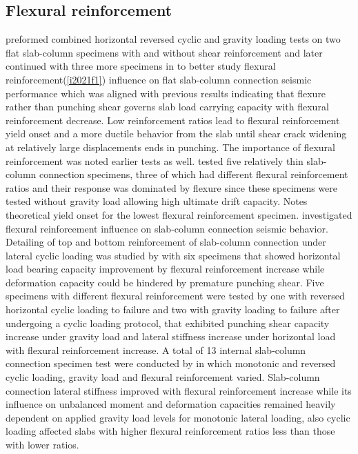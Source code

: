 \subsection{Flexural reinforcement}
\cite{isufi2020} preformed combined horizontal reversed cyclic and gravity loading tests on two flat slab-column specimens with and without shear reinforcement and later continued with three more specimens in \cite{isufi2021} to better study flexural reinforcement(\ref{i2021f1}) influence on flat slab-column connection seismic performance which was aligned with previous results\citep{muttoni2008punching,guandalini2009punching,ghali2019,torabian2019} indicating that flexure rather than punching shear governs slab load carrying capacity with flexural reinforcement decrease. Low reinforcement ratios lead to flexural reinforcement yield onset and a more ductile behavior from the slab until shear crack widening at relatively large displacements ends in punching\citep{muttoni2008punching,torabian2020,torabian2019}. The importance of flexural reinforcement was noted earlier tests as well\citep{hawkins1974w,symonds1976}. \cite{morrison1983lateral} tested five relatively thin slab-column connection specimens, three of which had different flexural reinforcement ratios and their response was dominated by flexure since these specimens were tested without gravity load allowing high ultimate drift capacity. \cite{morrison1983lateral} Notes theoretical yield onset for the lowest flexural reinforcement specimen. \cite{emam1997seismic,marzouk2001cyclic} investigated flexural reinforcement influence on slab-column connection seismic behavior. Detailing of top and bottom reinforcement of slab-column connection under lateral cyclic loading was studied by \cite{Robertson2006} with six specimens that showed horizontal load bearing capacity improvement by flexural reinforcement increase while deformation capacity could be hindered by premature punching shear.  Five specimens with different flexural reinforcement were tested by \cite{tian2008behavior} one with reversed horizontal cyclic loading to failure and two with gravity loading to failure after undergoing a cyclic loading protocol, that exhibited punching shear capacity increase under gravity load and lateral stiffness increase under horizontal load with flexural reinforcement increase. A total of 13 internal slab-column connection specimen test were conducted by \cite{drakatos2016} in which monotonic and reversed cyclic loading, gravity load and flexural reinforcement varied. Slab-column connection lateral stiffness improved with flexural reinforcement increase while its influence on unbalanced moment and deformation capacities remained heavily dependent on applied gravity load levels for monotonic lateral loading, also cyclic loading affected slabs with higher flexural reinforcement ratios less than those with lower ratios. 

